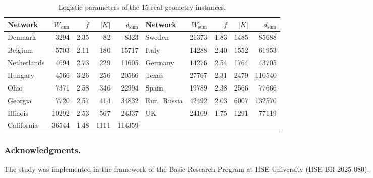 \documentclass[runningheads]{llncs}
\begin{document}
\begin{table}[h]
\centering
\caption{Logistic parameters of the 15 real-geometry instances.}
\label{tab:real-inst}
\footnotesize
\setlength{\tabcolsep}{3.6pt}
\begin{tabular}{lrrrr@{\hskip 0.8em}lrrrr}
\toprule
Network & $W_{\text{sum}}$ & $\bar f$ & $|K|$ & $d_{\text{sum}}$ &
Network & $W_{\text{sum}}$ & $\bar f$ & $|K|$ & $d_{\text{sum}}$\\
\midrule
Denmark     & 3294  & 2.35 & 82   & 8323   & Sweden       & 21373 & 1.83 & 1485 & 85688\\
Belgium     & 5703  & 2.11 & 180  & 15717  & Italy        & 14288 & 2.40 & 1552 & 61953\\
Netherlands & 4694  & 2.73 & 229  & 11605  & Germany      & 14276 & 2.54 & 1764 & 43705\\
Hungary     & 4566  & 3.26 & 256  & 20566  & Texas        & 27767 & 2.31 & 2479 & 110540\\
Ohio        & 7371  & 2.58 & 346  & 22994  & Spain        & 19789 & 2.38 & 2566 & 77666\\
Georgia     & 7720  & 2.57 & 414  & 34832  & Eur.\ Russia & 42492 & 2.03 & 6007 & 132570\\
Illinois    & 10292 & 2.53 & 567  & 24337  & UK           & 24109 & 1.75 & 1291 & 77119\\
California  & 36544 & 1.48 & 1111 & 114359 & & & & &\\
\bottomrule
\end{tabular}
\end{table}

\subsubsection*{Acknowledgments.}
The study was implemented in the framework of the Basic Research Program at
HSE University (HSE-BR-2025-080).
\end{document}
